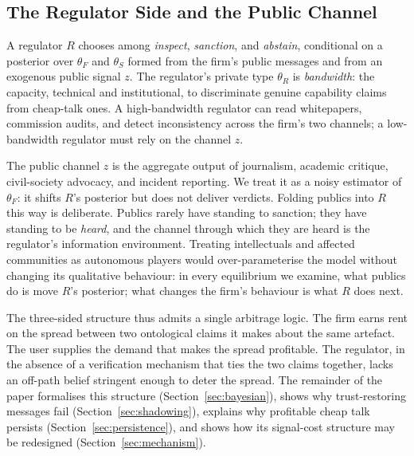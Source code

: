 \documentclass[preprint,authoryear]{elsarticle}
\theoremstyle{definition}
\theoremstyle{plain}
\begin{document}
\subsection{The Regulator Side and the Public Channel}
\label{subsec:regulator-side}

A regulator $R$ chooses among \emph{inspect}, \emph{sanction}, and \emph{abstain}, conditional on a posterior over $\theta_F$ and $\theta_S$ formed from the firm's public messages and from an exogenous public signal $z$. The regulator's private type $\theta_R$ is \emph{bandwidth}: the capacity, technical and institutional, to discriminate genuine capability claims from cheap-talk ones. A high-bandwidth regulator can read whitepapers, commission audits, and detect inconsistency across the firm's two channels; a low-bandwidth regulator must rely on the channel $z$.

The public channel $z$ is the aggregate output of journalism, academic critique, civil-society advocacy, and incident reporting. We treat it as a noisy estimator of $\theta_F$: it shifts $R$'s posterior but does not deliver verdicts. Folding publics into $R$ this way is deliberate. Publics rarely have standing to sanction; they have standing to be \emph{heard}, and the channel through which they are heard is the regulator's information environment. Treating intellectuals and affected communities as autonomous players would over-parameterise the model without changing its qualitative behaviour: in every equilibrium we examine, what publics do is move $R$'s posterior; what changes the firm's behaviour is what $R$ does next.

The three-sided structure thus admits a single arbitrage logic. The firm earns rent on the spread between two ontological claims it makes about the same artefact. The user supplies the demand that makes the spread profitable. The regulator, in the absence of a verification mechanism that ties the two claims together, lacks an off-path belief stringent enough to deter the spread. The remainder of the paper formalises this structure (Section~\ref{sec:bayesian}), shows why trust-restoring messages fail (Section~\ref{sec:shadowing}), explains why profitable cheap talk persists (Section~\ref{sec:persistence}), and shows how its signal-cost structure may be redesigned (Section~\ref{sec:mechanism}).
\end{document}
